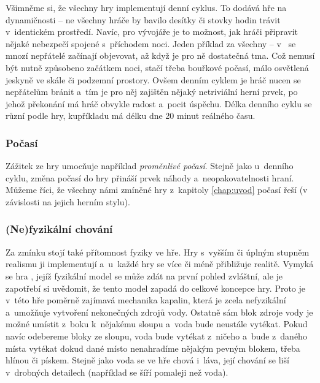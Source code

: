 Všimněme si, že všechny hry implementují denní cyklus. To dodává hře na dynamičnosti -- ne všechny hráče by bavilo desítky či stovky hodin trávit v~identickém prostředí. Navíc, pro vývojáře je to možnost, jak hráči připravit nějaké nebezpečí spojené s~příchodem noci. Jeden příklad za všechny -- v~ se mnozí nepřátelé začínají objevovat, až když je pro ně dostatečná tma. Což nemusí být nutně způsobeno začátkem noci, stačí třeba bouřkové počasí, málo osvětlená jeskyně ve skále či podzemní prostory. Ovšem denním cyklem je hráč nucen se nepřátelům bránit a~tím je pro něj zajištěn nějaký netriviální herní prvek, po jehož překonání má hráč obvykle radost a~pocit úspěchu.
Délka denního cyklu se různí podle hry, kupříkladu \MC{} má délku dne 20 minut reálného času.


\subsubsection{Počasí}
Zážitek ze hry umocňuje například \textit{proměnlivé počasí}. Stejně jako u~denního cyklu, změna počasí do hry přináší prvek náhody a~neopakovatelnosti hraní. Můžeme říci, že všechny námi zmíněné hry z~kapitoly \ref{chap:uvod} počasí řeší (v závislosti na jejich herním stylu). 

\subsubsection{(Ne)fyzikální chování}

Za zmínku stojí také přítomnost fyziky ve hře. Hry s~vyšším či úplným stupněm realismu ji implementují a~u~každé hry se více či méně přibližuje realitě. Vymyká se hra \MC{}, jejíž fyzikální model se může zdát na první pohled zvláštní, ale je zapotřebí si uvědomit, že tento model zapadá do celkové koncepce hry. Proto je v~této hře poměrně zajímavá mechanika kapalin, která je zcela nefyzikální a~umožňuje vytvoření nekonečných zdrojů vody. Ostatně sám blok zdroje vody je možné umístit z~boku k~nějakému sloupu a~voda bude neustále vytékat. Pokud navíc odebereme bloky ze sloupu, voda bude vytékat z~ničeho a~bude z~daného místa vytékat dokud dané místo nenahradíme nějakým pevným blokem, třeba hlínou či pískem. Stejně jako voda se ve hře chová i~láva, její chování se liší v~drobných detailech (například se šíří pomaleji než voda).

